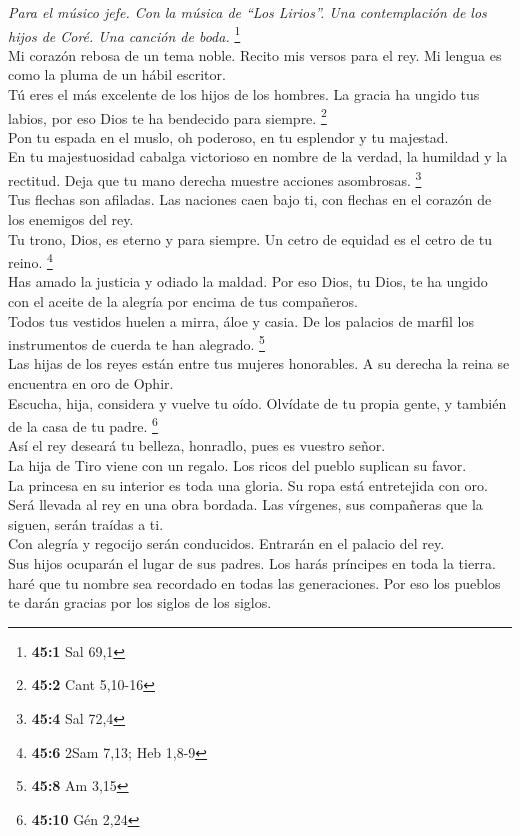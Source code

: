 \emph{Para el músico jefe. Con la música de ``Los Lirios''. Una
contemplación de los hijos de Coré. Una canción de boda.} \footnote{\textbf{45:1}
  Sal 69,1}\\
 Mi corazón rebosa de un tema noble. Recito mis versos
para el rey. Mi lengua es como la pluma de un hábil escritor.\\
 Tú eres el más excelente de los hijos de los hombres. La
gracia ha ungido tus labios, por eso Dios te ha bendecido para siempre.
\footnote{\textbf{45:2} Cant 5,10-16}\\
 Pon tu espada en el muslo, oh poderoso, en tu esplendor y
tu majestad.\\
 En tu majestuosidad cabalga victorioso en nombre de la
verdad, la humildad y la rectitud. Deja que tu mano derecha muestre
acciones asombrosas. \footnote{\textbf{45:4} Sal 72,4}\\
 Tus flechas son afiladas. Las naciones caen bajo ti, con
flechas en el corazón de los enemigos del rey.\\
 Tu trono, Dios, es eterno y para siempre. Un cetro de
equidad es el cetro de tu reino. \footnote{\textbf{45:6} 2Sam 7,13; Heb
  1,8-9}\\
 Has amado la justicia y odiado la maldad. Por eso Dios,
tu Dios, te ha ungido con el aceite de la alegría por encima de tus
compañeros.\\
 Todos tus vestidos huelen a mirra, áloe y casia. De los
palacios de marfil los instrumentos de cuerda te han alegrado.
\footnote{\textbf{45:8} Am 3,15}\\
 Las hijas de los reyes están entre tus mujeres
honorables. A su derecha la reina se encuentra en oro de Ophir.\\
 Escucha, hija, considera y vuelve tu oído. Olvídate de
tu propia gente, y también de la casa de tu padre. \footnote{\textbf{45:10}
  Gén 2,24}\\
 Así el rey deseará tu belleza, honradlo, pues es vuestro
señor.\\
 La hija de Tiro viene con un regalo. Los ricos del
pueblo suplican su favor.\\
 La princesa en su interior es toda una gloria. Su ropa
está entretejida con oro.\\
 Será llevada al rey en una obra bordada. Las vírgenes,
sus compañeras que la siguen, serán traídas a ti.\\
 Con alegría y regocijo serán conducidos. Entrarán en el
palacio del rey.\\
 Sus hijos ocuparán el lugar de sus padres. Los harás
príncipes en toda la tierra.\\
 haré que tu nombre sea recordado en todas las
generaciones. Por eso los pueblos te darán gracias por los siglos de los
siglos.

